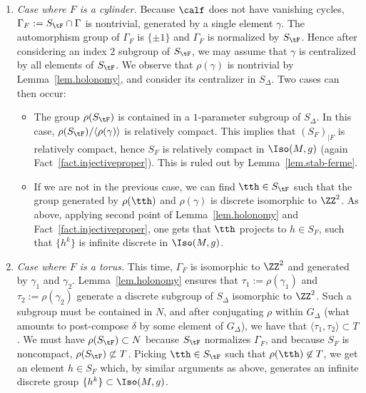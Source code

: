 \begin{enumerate}
\item \label{listprf8.15.b}\emph{Case where $F$ is a cylinder.} Because $\calf$ does not have vanishing cycles, $\Gamma_F:=S_{\tF} \cap \Gamma$ is nontrivial, generated by a single element ${\gamma}$. The automorphism group of $\Gamma_F$ is $\{ \pm 1\}$ and $\Gamma_F$ is normalized by $S_{\tF}$. Hence after considering an index $2$ subgroup of $S_{\tF}$, we may assume that $\gamma$ is centralized by all elements of $S_{\tF}$. We observe that $\rho(\gamma)$ is nontrivial by Lemma~\ref{lem.holonomy}, and consider its centralizer in $S_{\Delta}$. Two cases can then occur:
\begin{itemize}
\item \label{listprf8.15.b.1}The group $\rho(S_{\tF})$ is contained in a $1$-parameter subgroup of $S_{\Delta}$. In this case, $\rho(S_{\tF})/\langle\rho(\gamma)\rangle$ is relatively compact. This implies that $(S_F)_{|F}$ is relatively compact, hence $S_F$ is relatively compact in $\Iso(M,g)$ (again Fact~\ref{fact.injectiveproper}). This is ruled out by Lemma~\ref{lem.stab-ferme}.
\item \label{listprf8.15.b.2}If we are not in the previous case, we can find $\tth \in S_{\tF}$ such that the group generated by $\rho(\tth)$ and $\rho(\gamma)$ is discrete isomorphic to $\ZZ^2$. As above, applying second point of Lemma~\ref{lem.holonomy} and Fact~\ref{fact.injectiveproper}, one gets that $\tth$ projects to $h \in S_F$, such that $\{ h^k \}$ is infinite discrete in $\Iso(M,g)$.
\end{itemize}
\item \label{listprf8.15.c}\emph{Case where $F$ is a torus.} This time, $\Gamma_{F}$ is isomorphic to $\ZZ^2$ and generated by $\gamma_1$ and $\gamma_2$. Lemma~\ref{lem.holonomy} ensures that $\tau_1:=\rho(\gamma_1)$ and $\tau_2:=\rho(\gamma_2)$ generate a discrete subgroup of $S_{\Delta}$ isomorphic to $\ZZ^2$. Such a subgroup must be contained in $N$, and after conjugating $\rho$ within $G_{\Delta}$ (what amounts to post-compose $\delta$ by some element of $G_{\Delta}$), we have that $\langle\tau_1,\tau_2\rangle \subset T$. We must have $\rho(S_{\tF}) \subset N$ because $S_{\tF}$ normalizes $\Gamma_F$, and because $S_F$ is noncompact, $\rho(S_{\tF}) \not \subset T$. Picking $\tth \in S_{\tF}$ such that $\rho(\tth) \not \in T$, we get an element $h \in S_F$ which, by similar arguments as above, generates an infinite discrete group $\{ h^k \} \subset \Iso(M,g)$.
\end{enumerate}



